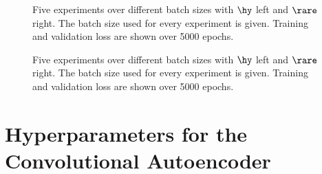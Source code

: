 \begin{center}
	\begin{figure}[htbp!]
		
		
		\caption{Five experiments over different batch sizes with $\hy$ left and $\rare$ right. The batch size used for every experiment is given. Training and validation loss are shown over 5000 epochs.}
		\label{Fig:batch}
	\end{figure}
\end{center}
\begin{center}
	\begin{figure}[H]
		
		
	\end{figure}
\end{center}
\begin{figure}[H]
	
	
		\caption{Five experiments over different batch sizes with $\hy$ left and $\rare$ right. The batch size used for every experiment is given. Training and validation loss are shown over 5000 epochs.}
\end{figure}
\chapter{Hyperparameters for the Convolutional Autoencoder}
\label{Ch:ApB}

